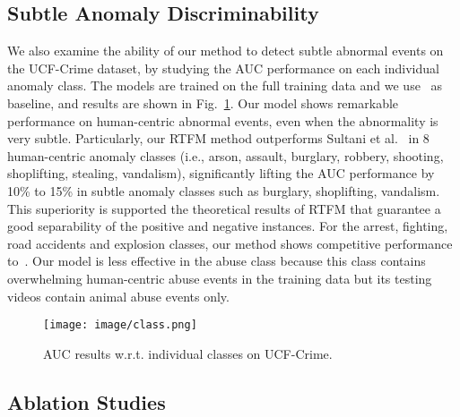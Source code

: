 \documentclass[final]{cvpr}
\begin{document}
\subsection{Subtle Anomaly Discriminability}

We also examine the ability of our method to detect subtle abnormal events on the UCF-Crime dataset, by studying the AUC performance on each individual anomaly class. 
The models are trained on the full training data and we use~\cite{sultani2018real} as baseline, and results are shown in Fig.~\ref{fig:class_AUC}. Our model shows remarkable performance on human-centric abnormal events, even when the abnormality is very subtle. Particularly, our RTFM method outperforms Sultani et al.~\cite{sultani2018real} in 8 human-centric anomaly classes (i.e., arson, assault, burglary, robbery, shooting, shoplifting, stealing, vandalism), significantly lifting the AUC performance by 10\% to 15\% in subtle anomaly classes such as burglary, shoplifting, vandalism. This superiority is supported the theoretical results of RTFM that guarantee a good separability of the positive and negative instances. For the arrest, fighting, road accidents and explosion classes, our method shows competitive performance to~\cite{sultani2018real}. Our model is less effective in the abuse class because this class contains overwhelming human-centric abuse events in the training data but its testing videos contain animal abuse events only. 





\begin{figure}[h!]
\begin{center}
\texttt{[image: image/class.png]}
\end{center}
  \caption{AUC results w.r.t. individual classes on UCF-Crime. 
}
\label{fig:class_AUC}
\end{figure}

\subsection{Ablation Studies}
\end{document}
